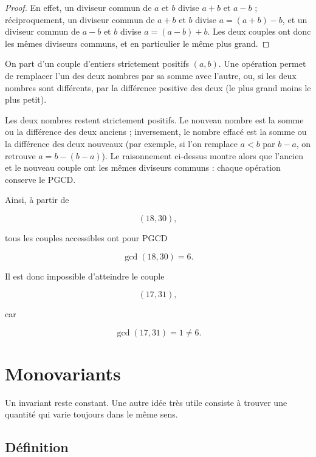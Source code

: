 \documentclass[11pt]{article}
\begin{document}
\begin{proof}
En effet, un diviseur commun de \(a\) et \(b\) divise \(a+b\) et \(a-b\) ;
réciproquement, un diviseur commun de \(a+b\) et \(b\) divise
\(a=(a+b)-b\), et un diviseur commun de \(a-b\) et \(b\) divise
\(a=(a-b)+b\). Les deux couples ont donc les mêmes diviseurs communs, et en
particulier le même plus grand.
\end{proof}

\begin{exemple}\label{exm:pgcd-couple}
On part d'un couple d'entiers strictement positifs \((a,b)\). Une opération
permet de remplacer l'un des deux nombres par sa somme avec l'autre, ou, si
les deux nombres sont différents, par la différence positive des deux
(le plus grand moins le plus petit).

Les deux nombres restent strictement positifs. Le nouveau nombre est la somme
ou la différence des deux anciens ; inversement, le nombre effacé est la somme
ou la différence des deux nouveaux (par exemple, si l'on remplace \(a<b\) par
\(b-a\), on retrouve \(a=b-(b-a)\)). Le raisonnement ci-dessus montre alors
que l'ancien et le nouveau couple ont les mêmes diviseurs communs : chaque
opération conserve le PGCD.

Ainsi, à partir de

\[
(18,30),
\]

tous les couples accessibles ont pour PGCD

\[
\gcd(18,30)=6.
\]

Il est donc impossible d'atteindre le couple

\[
(17,31),
\]

car

\[
\gcd(17,31)=1\neq 6.
\]
\end{exemple}

\section{Monovariants}\label{sec:monovariants}

Un invariant reste constant. Une autre idée très utile consiste à trouver une
quantité qui varie toujours dans le même sens.

\subsection{Définition}\label{sec:definition-monovariant}
\end{document}
